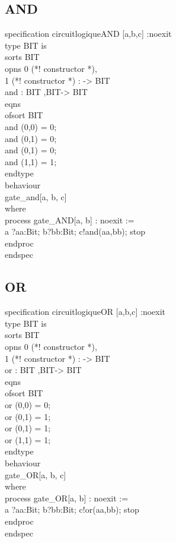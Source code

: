 \documentclass{article}
\begin{document}
   \subsection*{AND}
    specification circuitlogiqueAND [a,b,c] :noexit \\
    type BIT is \\
        sorts BIT\\
        opns 0 (*! constructor *), \\
            1 (*! constructor *) : -> BIT\\
        and : BIT ,BIT-> BIT\\
        eqns \\
            ofsort BIT \\
            and (0,0) = 0; \\
            and (0,1) = 0; \\
            and (0,1) = 0; \\
            and (1,1) = 1; \\
    endtype\\ 
    behaviour\\ 
        gate_and[a, b, c]\\
    where \\
        process gate_AND[a, b] : noexit :=\\ 
        a ?aa:Bit; b?bb:Bit;  c!and(aa,bb); stop \\
        endproc \\
    endspec\\
    \subsection*{OR}
    specification circuitlogiqueOR [a,b,c] :noexit \\
    type BIT is \\
        sorts BIT\\
        opns 0 (*! constructor *), \\
            1 (*! constructor *) : -> BIT\\
        or : BIT ,BIT-> BIT\\
        eqns \\
            ofsort BIT \\
            or (0,0) = 0; \\
            or (0,1) = 1; \\
            or (0,1) = 1; \\
            or (1,1) = 1; \\
    endtype\\ 
    behaviour\\ 
        gate_OR[a, b, c]\\
    where \\
        process gate_OR[a, b] : noexit :=\\ 
        a ?aa:Bit; b?bb:Bit;  c!or(aa,bb); stop \\
        endproc \\
    endspec\\
  
\end{document}

